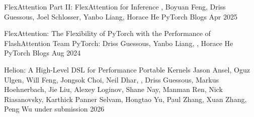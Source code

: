 \PubListEnd


\PubItemCV
{FlexAttention Part II: FlexAttention for Inference} %
{, Boyuan Feng, Driss Guessous, Joel Schlosser, Yanbo Liang, Horace He} %
{PyTorch Blogs} %
{Apr 2025} %
{} %
{} %

\PubItemCV
{FlexAttention: The Flexibility of PyTorch with the Performance of FlashAttention} %
{Team PyTorch: Driss Guessous, Yanbo Liang, , Horace He} %
{PyTorch Blogs} %
{Aug 2024} %
{} %
{} %

\PubListEnd




\PubItemCV
{Helion: A High-Level DSL for Performance Portable Kernels} %
{Jason Ansel,
Oguz Ulgen,
Will Feng,
Jongsok Choi,
Neil Dhar,
,
Driss Guessous,
Markus Hoehnerbach,
Jie Liu,
Alexey Loginov,
Shane Nay,
Manman Ren,
Nick Riasanovsky,
Karthick Panner Selvam,
Hongtao Yu,
Paul Zhang,
Xuan Zhang,
Peng Wu} %
{under submission} %
{2026} %
{} %
{} %



\PubListEnd

